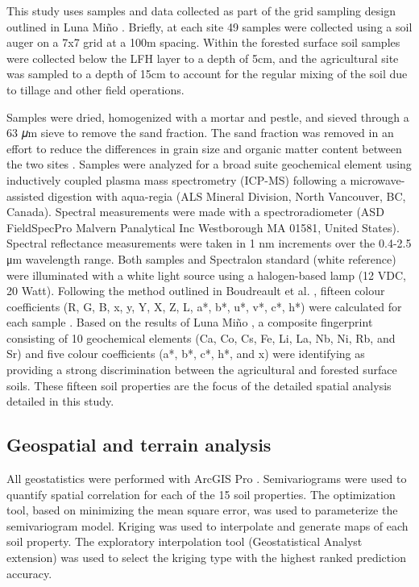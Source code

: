 \documentclass[
  number]{elsarticle}
\begin{document}
This study uses samples and data collected as part of the grid sampling
design outlined in Luna Miño \citep{lunamiño2024}. Briefly, at each site
49 samples were collected using a soil auger on a 7x7 grid at a 100m
spacing. Within the forested surface soil samples were collected below
the LFH layer to a depth of 5cm, and the agricultural site was sampled
to a depth of 15cm to account for the regular mixing of the soil due to
tillage and other field operations.

Samples were dried, homogenized with a mortar and pestle, and sieved
through a 63 𝜇m sieve to remove the sand fraction. The sand fraction was
removed in an effort to reduce the differences in grain size and organic
matter content between the two sites \citep{laceby2017}. Samples were
analyzed for a broad suite geochemical element using inductively coupled
plasma mass spectrometry (ICP-MS) following a microwave-assisted
digestion with aqua-regia (ALS Mineral Division, North Vancouver, BC,
Canada). Spectral measurements were made with a spectroradiometer (ASD
FieldSpecPro Malvern Panalytical Inc Westborough MA 01581, United
States). Spectral reflectance measurements were taken in 1 nm increments
over the 0.4-2.5 μm wavelength range. Both samples and Spectralon
standard (white reference) were illuminated with a white light source
using a halogen-based lamp (12 VDC, 20 Watt). Following the method
outlined in Boudreault et al. \citep{boudreault2018}, fifteen colour
coefficients (R, G, B, x, y, Y, X, Z, L, a*, b*, u*, v*, c*, h*) were
calculated for each sample \citep{koiter2021}. Based on the results of
Luna Miño \citep{lunamiño2024}, a composite fingerprint consisting of 10
geochemical elements (Ca, Co, Cs, Fe, Li, La, Nb, Ni, Rb, and Sr) and
five colour coefficients (a*, b*, c*, h*, and x) were identifying as
providing a strong discrimination between the agricultural and forested
surface soils. These fifteen soil properties are the focus of the
detailed spatial analysis detailed in this study.

\subsection{Geospatial and terrain
analysis}\label{geospatial-and-terrain-analysis}

All geostatistics were performed with ArcGIS Pro \citep[v
3.3.0][]{esri2024}. Semivariograms were used to quantify spatial
correlation for each of the 15 soil properties. The optimization tool,
based on minimizing the mean square error, was used to parameterize the
semivariogram model. Kriging was used to interpolate and generate maps
of each soil property. The exploratory interpolation tool
(Geostatistical Analyst extension) was used to select the kriging type
with the highest ranked prediction accuracy.
\end{document}
